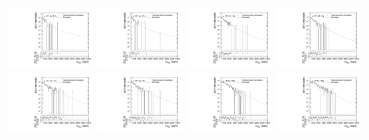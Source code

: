\begin{figure}[htbp]
  \includegraphics[width=0.2\textwidth]{fig/2Dfit/templateVsReco_res_r0_MVV_mu_HP_vbf_LDy.pdf}
  \includegraphics[width=0.2\textwidth]{fig/2Dfit/templateVsReco_res_r0_MVV_e_HP_vbf_LDy.pdf}
  \includegraphics[width=0.2\textwidth]{fig/2Dfit/templateVsReco_res_r0_MVV_mu_LP_vbf_LDy.pdf}
  \includegraphics[width=0.2\textwidth]{fig/2Dfit/templateVsReco_res_r0_MVV_e_LP_vbf_LDy.pdf}\\
  \includegraphics[width=0.2\textwidth]{fig/2Dfit/templateVsReco_res_r0_MVV_mu_HP_bb_HDy.pdf}
  \includegraphics[width=0.2\textwidth]{fig/2Dfit/templateVsReco_res_r0_MVV_e_HP_bb_HDy.pdf}
  \includegraphics[width=0.2\textwidth]{fig/2Dfit/templateVsReco_res_r0_MVV_mu_LP_bb_HDy.pdf}
  \includegraphics[width=0.2\textwidth]{fig/2Dfit/templateVsReco_res_r0_MVV_e_LP_bb_HDy.pdf}\\

\end{figure}
